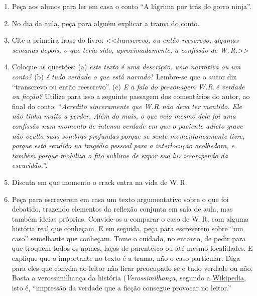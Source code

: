\documentclass[12pt]{extarticle}
\begin{document}
   \begin{enumerate}
   	\item Peça aos alunos para ler em casa o conto ``A lágrima por trás do gorro ninja''. 

   	\item No dia da aula, peça para alguém explicar a trama do conto. 

   	\item Cite a primeira frase do livro: <<\emph{transcrevo, ou então reescrevo, algumas semanas depois, o que teria sido, aproximadamente, a confissão de W.\,R.>>}

   	\item Coloque as questões: 
   	(a) \textit{este texto é uma descrição, uma narrativa ou um conto?}
   	(b) \textit{é tudo verdade o que está narrado}? Lembre-se que o autor diz  
   	``transcrevo ou então reescrevo''. 
   	(c) \textit{E a fala do personagem W.R.\,é verdade ou ficção?} Utilize para isso a 
   	seguinte passagem dos comentários do autor, ao final do conto:
   	``\emph{Acredito sinceramente que {W.R.}\,não deva ter mentido. Ele não tinha
	muito a perder. Além do mais, o que veio mesmo dele foi uma confissão
	num momento de intensa verdade em que o paciente adicto grave não oculta
	suas sombras profundas porque se sente momentaneamente livre, porque
	está rendido na tragédia pessoal para a interlocução acolhedora, e
	também porque mobiliza o fito sublime de expor sua luz irrompendo da
	escuridão.}''.
 
   	\item Discuta em que momento o crack entra na vida de W.\,R. 

	\item 
	Peça para escreverem em casa um texto argumentativo sobre o que foi 
	debatido, trazendo elementos da reflexão conjunta em sala de aula, mas também ideias próprias.
	Convide-os a comparar o caso de W.\,R. com alguma história real que conheçam. 
	E em seguida, peça para escreverem sobre ``um caso'' semelhante que conheçam.
	Tome o cuidado, no entanto, de pedir para que troquem todos os nomes, laços de
	parentesco ou até mesmo localidades. E explique que o importante no texto 
	é a trama, não o caso particular. Diga para eles que convém 
	ao leitor não ficar preocupado se é tudo verdade ou não. Basta a 
	verossimilhança da história (\emph{Verossimilhança}, segundo a 
	\href{https://pt.wikipedia.org/wiki/Verossimilhan\%C3\%A7a\#:~:text=Verossimilhan\%C3\%A7a\%20\%C3\%A9\%20a\%20impress\%C3\%A3o\%20da,que\%20acontecem\%20na\%20realidade\%20vivida}{Wikipedia}, isto é, ``impressão da verdade que a ficção 
	consegue provocar no leitor.''
   \end{enumerate}
\end{document}
